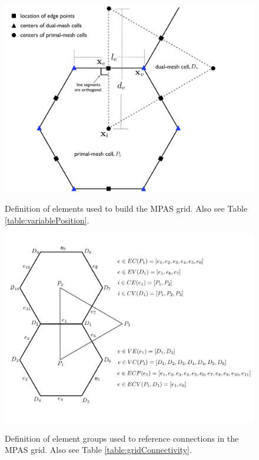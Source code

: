 %
\begin{figure}[t]
  \noindent\includegraphics[width=16cm,angle=0]{./shared/figures/variablePosition.pdf}\\
  \caption{Definition of elements used to build the MPAS grid. Also see Table \ref{table:variablePosition}.}
  \label{figure:variablePosition}
\end{figure}

%
\begin{figure}[t]
   \noindent\includegraphics[width=16cm,angle=0]{./shared/figures/gridConnectivity.pdf}\\
  \caption{Definition of element groups used to reference connections in the MPAS grid. Also see Table \ref{table:gridConnectivity}.}
  \label{figure:gridConnectivity}
\end{figure}


